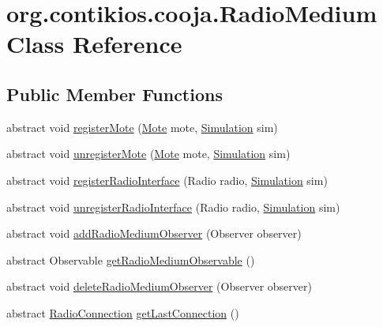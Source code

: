 \hypertarget{classorg_1_1contikios_1_1cooja_1_1RadioMedium}{\section{org.\-contikios.\-cooja.\-Radio\-Medium Class Reference}
\label{classorg_1_1contikios_1_1cooja_1_1RadioMedium}
}
\subsection*{Public Member Functions}
\begin{DoxyCompactItemize}
\item 
abstract void \hyperlink{classorg_1_1contikios_1_1cooja_1_1RadioMedium_a39920abebfaeb932d81f000105c82840}{register\-Mote} (\hyperlink{interfaceorg_1_1contikios_1_1cooja_1_1Mote}{Mote} mote, \hyperlink{classorg_1_1contikios_1_1cooja_1_1Simulation}{Simulation} sim)
\item 
abstract void \hyperlink{classorg_1_1contikios_1_1cooja_1_1RadioMedium_a806edffedd9606780fe56939fa725d80}{unregister\-Mote} (\hyperlink{interfaceorg_1_1contikios_1_1cooja_1_1Mote}{Mote} mote, \hyperlink{classorg_1_1contikios_1_1cooja_1_1Simulation}{Simulation} sim)
\item 
abstract void \hyperlink{classorg_1_1contikios_1_1cooja_1_1RadioMedium_a81b6c3a9c65b25b22ea1873a9e86fc98}{register\-Radio\-Interface} (Radio radio, \hyperlink{classorg_1_1contikios_1_1cooja_1_1Simulation}{Simulation} sim)
\item 
abstract void \hyperlink{classorg_1_1contikios_1_1cooja_1_1RadioMedium_ab51a23482434fc03797ccdb07f296907}{unregister\-Radio\-Interface} (Radio radio, \hyperlink{classorg_1_1contikios_1_1cooja_1_1Simulation}{Simulation} sim)
\item 
abstract void \hyperlink{classorg_1_1contikios_1_1cooja_1_1RadioMedium_af9064dbe7a700b6d3a8c04b1b8d671b8}{add\-Radio\-Medium\-Observer} (Observer observer)
\item 
abstract Observable \hyperlink{classorg_1_1contikios_1_1cooja_1_1RadioMedium_a5afe3150f3cec816ff0a8bae5e23b3db}{get\-Radio\-Medium\-Observable} ()
\item 
abstract void \hyperlink{classorg_1_1contikios_1_1cooja_1_1RadioMedium_a6d7e1bb0b233bb7040d19376ff861a3c}{delete\-Radio\-Medium\-Observer} (Observer observer)
\item 
abstract \hyperlink{classorg_1_1contikios_1_1cooja_1_1RadioConnection}{Radio\-Connection} \hyperlink{classorg_1_1contikios_1_1cooja_1_1RadioMedium_aa260c46b107c56d6dcb38c3402828bca}{get\-Last\-Connection} ()

\end{DoxyCompactItemize}
